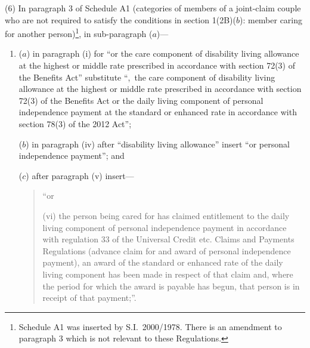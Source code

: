 \documentclass[12pt,a4paper]{article}
\begin{document}
(6) In paragraph 3 of Schedule A1 (categories of members of a joint-claim couple who are not required to satisfy the conditions in section 1(2B)($b$): member caring for another person)\footnote{Schedule A1 was inserted by S.I.~2000/1978. There is an amendment to paragraph 3 which is not relevant to these Regulations.}, in sub-paragraph ($a$)—
\begin{enumerate}\item[]
($a$) in paragraph (i)  for “or the care component of disability living allowance at the highest or middle rate prescribed in accordance with section 72(3) of the Benefits Act” substitute “,~the care component of disability living allowance at the highest or middle rate prescribed in accordance with section 72(3) of the Benefits Act or the daily living component of personal independence payment at the standard or enhanced rate in accordance with section 78(3) of the 2012 Act”;

($b$) in paragraph (iv)  after “disability living allowance” insert “or personal independence payment”; and

($c$) after paragraph (v)  insert—
\begin{quotation}
“or

(vi) the person being cared for has claimed entitlement to the daily living component of personal independence payment in accordance with regulation 33 of the Universal Credit etc. Claims and Payments Regulations (advance claim for and award of personal independence payment), an award of the standard or enhanced rate of the daily living component has been made in respect of that claim and, where the period for which the award is payable has begun, that person is in receipt of that payment;”.
\end{quotation}
\end{enumerate}
\end{document}
